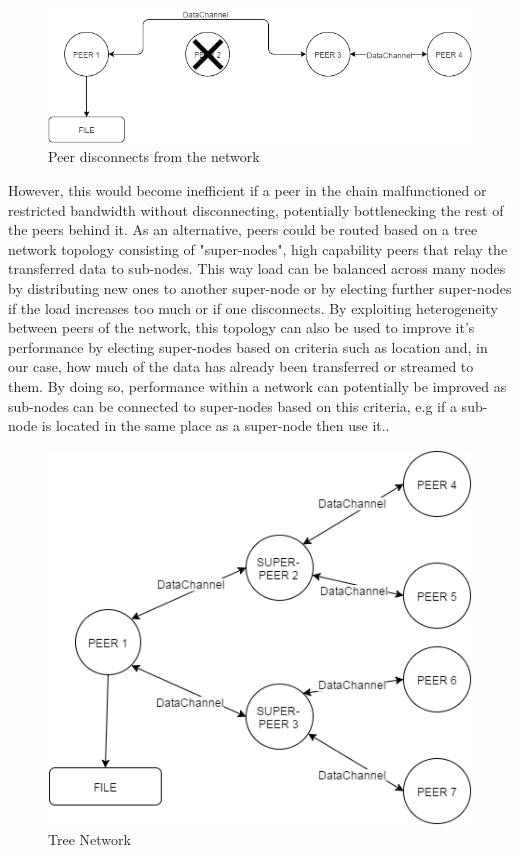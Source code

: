 \documentclass[]{report}
\begin{document}
	\begin{figure}[H]
		\centering
		\caption{Peer disconnects from the network}
		\includegraphics[scale=0.4]{peerdisconnect.png}
	\end{figure}
	
	However, this would become inefficient if a peer in the chain malfunctioned or restricted bandwidth without disconnecting, potentially bottlenecking the rest of the peers behind it. As an alternative, peers could be routed based on a tree network topology \cite{Tree Topology} consisting of "super-nodes", high capability peers that relay the transferred data to sub-nodes. This way load can be balanced across many nodes by distributing new ones to another super-node or by electing further super-nodes if the load increases too much or if one disconnects. By exploiting heterogeneity between peers of the network, this topology can also be used to improve it's performance by electing super-nodes based on criteria such as location and, in our case, how much of the data has already been transferred or streamed to them. By doing so, performance within a network can potentially be improved as sub-nodes can be connected to super-nodes based on this criteria, e.g if a sub-node is located in the same place as a super-node then use it.\cite{Supernodes}.		
	\begin{figure}[H]
		\centering
		\caption{Tree Network}
		\includegraphics[scale=0.4]{treetopology.png}
	\end{figure}			
	
\end{document}
